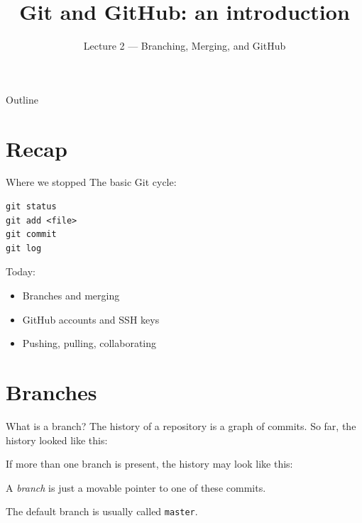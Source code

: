 \documentclass[11pt]{beamer}
\title{Git and GitHub: an introduction}
\subtitle{Lecture 2 --- Branching, Merging, and GitHub}
\author{}
\date{}
\begin{document}
\begin{frame}
  \titlepage
\end{frame}

\begin{frame}{Outline}
  \tableofcontents
\end{frame}

\section{Recap}

\begin{frame}[fragile]{Where we stopped}
  The basic Git cycle:
\begin{lstlisting}
git status
git add <file>
git commit
git log
\end{lstlisting}
  \vfill
  Today:
  \begin{itemize}
    \item Branches and merging
    \item GitHub accounts and SSH keys
    \item Pushing, pulling, collaborating
  \end{itemize}
\end{frame}

\section{Branches}

\begin{frame}[fragile]{What is a branch?}
  The history of a repository is a graph of commits.
  So far, the history looked like this:
  \begin{flushleft}
  \end{flushleft}
  If more than one branch is present, the history may look like this:
  \begin{flushleft}
  \end{flushleft}
  \vfill
  A \emph{branch} is just a movable pointer to one of these commits.

  The default branch is usually called \texttt{master}.
\end{frame}
\end{document}
